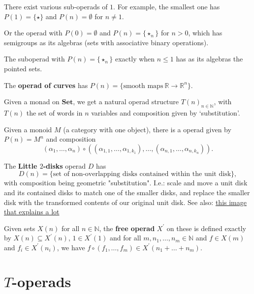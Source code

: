 \documentclass{amsbook}
\newcommand{\Catb}[1]{\mathbf{#1}}
\newcommand{\SET}{\Catb{Set}}
\theoremstyle{definition}
\begin{document}
  There exist various sub-operads of $ 1 $. For example, the smallest one has $ P(1) = \{ \star \} $ and $ P(n) = \emptyset $ for $ n \not = 1 $.

  Or the operad with $ P(0) = \emptyset $ and $ P(n) = \{ \star_n \} $ for $ n > 0 $, which has semigroups as its algebras (sets with associative binary operations).

  The suboperad with $ P(n) = \{ \star_n \} $ exactly when $ n \leq 1 $ has as its algebras the pointed sets.

  The \textbf{operad of curves} has $ P(n) = \{ \text{smooth maps}\ \mathbb R \to \mathbb R^n \} $.

  Given a monad on $ \SET $, we get a natural operad structure $ T(n)_{n \in \mathbb N} $, with $ T(n) $ the set of words in $ n $ variables and composition given by `substitution'.

  Given a monoid $ M $ (a category with one object), there is a operad given by $ P(n) = M^n $ and composition
  \[ (\alpha_1, \dots, \alpha_n) \circ ((\alpha_{1, 1}, \dots, \alpha_{1, k_1}), \dots, (\alpha_{n, 1}, \dots, \alpha_{n, k_n})). \]

  The \textbf{Little $ 2 $-disks} operad $ D $ has
  \[ D(n) = \{ \text{set of non-overlapping disks contained within the unit disk} \}, \]
  with composition being geometric "substitution". I.e.: scale and move a unit disk and its contained disks to match one of the smaller disks, and replace the smaller disk with the transformed contents of our original unit disk. See also: \href{https://upload.wikimedia.org/wikipedia/en/thumb/0/0b/Composition_in_the_little_discs_operad.svg/1920px-Composition_in_the_little_discs_operad.svg.png}{this image that explains a lot}

  Given sets $ X(n) $ for all $ n \in \mathbb N $, the \textbf{free operad} $ X^\prime $ on these is defined exactly by $ X(n) \subseteq X^\prime(n) $, $ 1 \in X^\prime(1) $ and for all $ m, n_1, \dots, n_m \in \mathbb N $ and $ f \in X(m) $ and $ f_i \in X^\prime(n_i) $, we have $ f \circ (f_1, \dots, f_m) \in X^\prime(n_1 + \dots + n_m) $.

  \section{\texorpdfstring{$ T $}{T}-operads}
\end{document}
